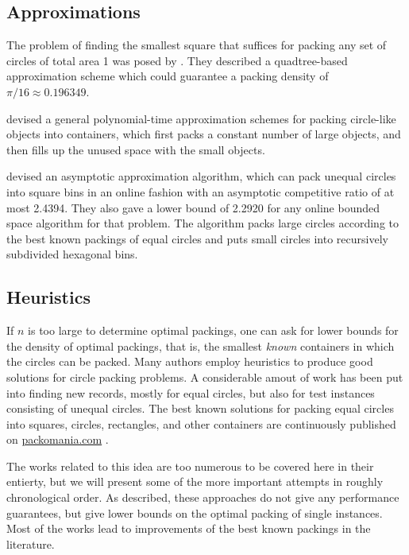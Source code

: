 \documentclass[a4paper,style=print,bibliography=totoc,nexus,lnum,extramargin]{tubsbook}
\begin{document}
\subsection{Approximations}

The problem of finding the smallest square that suffices for packing any set of circles of total area 1 was posed by \textcite{DFL2010circle}. They described a quadtree-based approximation scheme which could guarantee a packing density of $\pi/16 \approx 0.196349$.

\textcite{MPSSW2014polynomial} devised a general polynomial-time approximation schemes for packing circle-like objects into containers, which first packs a constant number of large objects, and then fills up the unused space with the small objects.

\textcite{HMS2016bounded} devised an asymptotic approximation algorithm, which can pack unequal circles into square bins in an online fashion with an asymptotic competitive ratio of at most 2.4394. They also gave a lower bound of 2.2920 for any online bounded space algorithm for that problem. The algorithm packs large circles according to the best known packings of equal circles and puts small circles into recursively subdivided hexagonal bins.

\subsection{Heuristics}

If $n$ is too large to determine optimal packings, one can ask for lower bounds for the density of optimal packings, that is, the smallest \emph{known} containers in which the circles can be packed.
Many authors employ heuristics to produce good solutions for circle packing problems.
A considerable amout of work has been put into finding new records, mostly for equal circles, but also for test instances consisting of unequal circles. The best known solutions for packing equal circles into squares, circles, rectangles, and other containers are continuously published on \url{packomania.com} \cite{specht2015packomania}.

The works related to this idea are too numerous to be covered here in their entierty, but we will present some of the more important attempts in roughly chronological order. As described, these approaches do not give any performance guarantees, but give lower bounds on the optimal packing of single instances. Most of the works lead to improvements of the best known packings in the literature.
\end{document}

